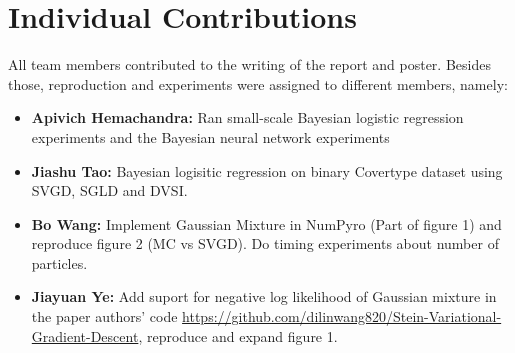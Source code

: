\section{Individual Contributions}
All team members contributed to the writing of the report and poster. Besides those, reproduction and experiments were assigned to different members, namely:
\begin{itemize}
    \item \textbf{Apivich Hemachandra: } Ran small-scale Bayesian logistic regression experiments and the Bayesian neural network experiments
    \item \textbf{Jiashu Tao:} Bayesian logisitic regression on binary Covertype dataset using SVGD, SGLD and DVSI.
    \item \textbf{Bo Wang:} Implement Gaussian Mixture in NumPyro (Part of figure 1) and reproduce figure 2 (MC vs SVGD). Do timing experiments about number of particles.
    \item \textbf{Jiayuan Ye:} Add suport for negative log likelihood of Gaussian mixture in the paper authors' code \url{https://github.com/dilinwang820/Stein-Variational-Gradient-Descent}, reproduce and expand figure 1. 
\end{itemize}